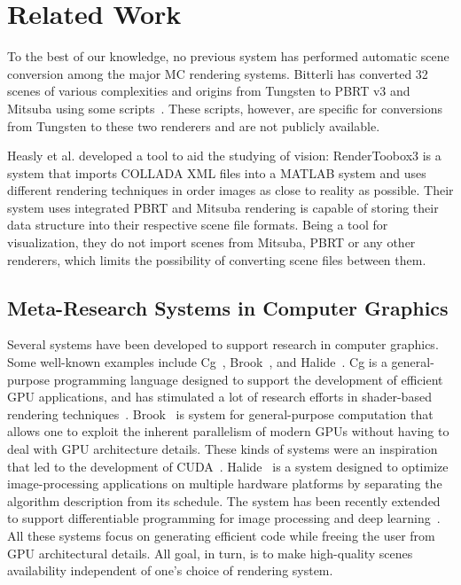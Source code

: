 \section{Related Work}
\label{(sec:related_work)}

To the best of our knowledge, no previous system has performed automatic scene conversion among the major MC rendering systems. 
Bitterli has converted 32 scenes of various complexities and origins from Tungsten to PBRT v3 and Mitsuba using some scripts~\cite{tungsten}. These scripts, however, are specific for conversions from Tungsten to these two renderers and are not publicly available. 

Heasly et al. developed a tool to aid the studying of vision: RenderToobox3 \cite{rendertoolbox} is a system that imports COLLADA XML files into a MATLAB system and uses different rendering techniques in order images as close to reality as possible. Their system uses integrated PBRT and Mitsuba rendering is capable of storing their data structure into their respective scene file formats. Being a tool for visualization, they do not import scenes from Mitsuba, PBRT or any other renderers, which limits the possibility of converting scene files between them. 

\subsection{Meta-Research Systems in Computer Graphics}

Several systems have been developed to support research in computer graphics. 
Some well-known examples include Cg~\cite{Mark2003}, Brook~\cite{Buck2004}, and Halide~\cite{Ragan-Kelley2012}.
Cg is a general-purpose programming language designed to support the development of efficient GPU applications, and has stimulated a lot of research efforts in shader-based rendering techniques~\cite{Policarpo2005, Policarpo2006, Wyman2005, Oliveira2007RRT}.  
Brook~\cite{Buck2004} is system for general-purpose computation that allows one to exploit the inherent parallelism of modern GPUs without having to deal with GPU architecture details. These kinds of systems were an inspiration that led to the development of CUDA~\cite{Nickolls2008}.
Halide~\cite{Ragan-Kelley2012} is a system designed to optimize image-processing applications on multiple hardware platforms by separating the algorithm description from its schedule. The system has been recently extended to support differentiable programming for image processing and deep learning~\cite{Li2018-Halide-Diff_Prog}. All these systems focus on generating efficient code while freeing the user from GPU architectural details. All goal, in turn, is to make high-quality scenes availability independent of one's choice of rendering system. 


